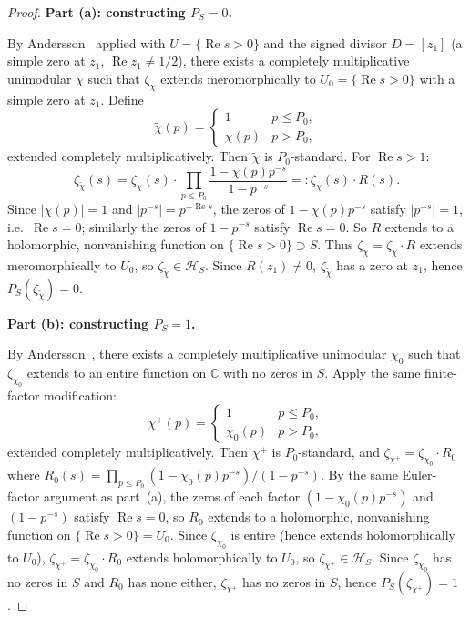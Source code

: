 \documentclass[12pt]{amsart}
\theoremstyle{definition}
\theoremstyle{remark}
\theoremstyle{plain}
\newcommand{\re}{\operatorname{Re}}
\newcommand{\CC}{\mathbb{C}}
\begin{document}
\begin{proof}
\textbf{Part (a): constructing $P_S=0$.}

By Andersson~\cite[Theorem~5]{Andersson2024} applied with $U = \{\re s > 0\}$
and the signed divisor $D = [z_1]$ (a simple zero at $z_1$, $\re z_1 \neq 1/2$),
there exists a completely
multiplicative unimodular $\chi$ such that $\zeta_\chi$ extends
meromorphically to $U_0=\{\re s>0\}$ with a simple zero at $z_1$.
Define
\[
  \tilde\chi(p) =
    \begin{cases} 1 & p \leq P_0, \\ \chi(p) & p > P_0, \end{cases}
\]
extended completely multiplicatively.  Then $\tilde\chi$ is
$P_0$-standard.  For $\re s > 1$:
\[
  \zeta_{\tilde\chi}(s) = \zeta_\chi(s) \cdot
    \prod_{p \leq P_0} \frac{1 - \chi(p)p^{-s}}{1 - p^{-s}}
  =: \zeta_\chi(s) \cdot R(s).
\]
Since $|\chi(p)| = 1$ and $|p^{-s}| = p^{-\re s}$, the zeros
of $1-\chi(p)p^{-s}$ satisfy $|p^{-s}|=1$, i.e.\ $\re s = 0$;
similarly the zeros of $1-p^{-s}$ satisfy $\re s = 0$.
So $R$ extends to a holomorphic, nonvanishing function on
$\{\re s > 0\} \supset S$.  Thus $\zeta_{\tilde\chi} = \zeta_\chi \cdot R$
extends meromorphically to $U_0$, so $\zeta_{\tilde\chi}\in\mathcal{H}_S$.
Since $R(z_1) \neq 0$, $\zeta_{\tilde\chi}$
has a zero at $z_1$, hence $P_S(\zeta_{\tilde\chi}) = 0$.

\textbf{Part (b): constructing $P_S=1$.}

By Andersson~\cite[Corollary~3]{Andersson2024}, there exists a completely
multiplicative unimodular $\chi_0$ such that $\zeta_{\chi_0}$ extends
to an entire function on $\CC$ with no zeros in $S$.  Apply the same
finite-factor modification:
\[
  \chi^+(p) =
    \begin{cases} 1 & p \leq P_0, \\ \chi_0(p) & p > P_0, \end{cases}
\]
extended completely multiplicatively.  Then $\chi^+$ is $P_0$-standard,
and
$\zeta_{\chi^+} = \zeta_{\chi_0} \cdot R_0$
where $R_0(s) = \prod_{p\le P_0}(1-\chi_0(p)p^{-s})/(1-p^{-s})$.
By the same Euler-factor argument as part~(a), the zeros of each factor
$(1-\chi_0(p)p^{-s})$ and $(1-p^{-s})$ satisfy $\re s = 0$, so $R_0$
extends to a holomorphic, nonvanishing function on $\{\re s > 0\} = U_0$.
Since $\zeta_{\chi_0}$ is entire (hence extends holomorphically to $U_0$),
$\zeta_{\chi^+} = \zeta_{\chi_0}\cdot R_0$ extends holomorphically to $U_0$,
so $\zeta_{\chi^+}\in\mathcal{H}_S$.
Since $\zeta_{\chi_0}$ has no zeros in $S$ and $R_0$ has none either,
$\zeta_{\chi^+}$ has no zeros in $S$, hence $P_S(\zeta_{\chi^+}) = 1$.
\end{proof}
\end{document}

